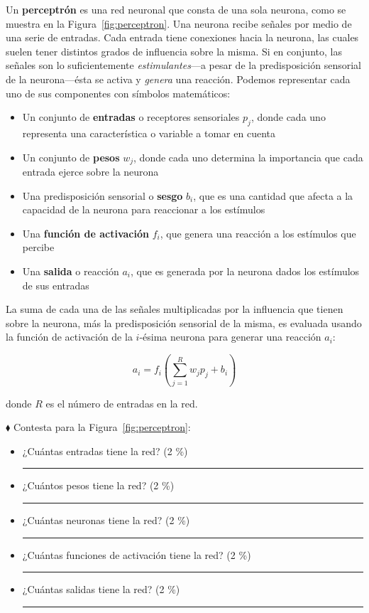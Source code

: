 \documentclass{article}
\newcommand{\veryshortresponserule}{{\large\rule{3 cm}{0.3mm}}}
\begin{document}
Un \textbf{perceptrón} es una red neuronal que consta de una sola neurona, como se muestra en la Figura~\ref{fig:perceptron}.
Una neurona recibe señales por medio de una serie de entradas.
Cada entrada tiene conexiones hacia la neurona, las cuales suelen tener distintos grados de influencia sobre la misma.
Si en conjunto, las señales son lo suficientemente \textit{estimulantes}---a pesar de la predisposición sensorial de la neurona---ésta se activa y \textit{genera} una reacción.
Podemos representar cada uno de sus componentes con símbolos matemáticos:
\begin{itemize}
    \item Un conjunto de \textbf{entradas} o receptores sensoriales $p_j$, donde cada uno representa una característica o variable a tomar en cuenta
    \item Un conjunto de \textbf{pesos} $w_{j}$, donde cada uno determina la importancia que cada entrada ejerce sobre la neurona
    \item Una predisposición sensorial o \textbf{sesgo} $b_i$, que es una cantidad que afecta a la capacidad de la neurona para reaccionar a los estímulos
    \item Una \textbf{función de activación} $f_i$, que genera una reacción a los estímulos que percibe
    \item Una \textbf{salida} o reacción $a_i$, que es generada por la neurona dados los estímulos de sus entradas
\end{itemize}

La suma de cada una de las señales multiplicadas por la influencia que tienen sobre la neurona, más la predisposición sensorial de la misma, es evaluada usando la función de activación de la $i$-ésima neurona para generar una reacción $a_i$:

\begin{equation}
    a_i = f_i\left( \sum_{j=1}^{R} w_jp_j + b_i \right)
\end{equation}

donde $R$ es el número de entradas en la red.

\vspace{2.5ex}

$\blacklozenge$ Contesta para la Figura~\ref{fig:perceptron}:

\begin{itemize}
    \item ¿Cuántas entradas tiene la red? (2 \%)\hfill \veryshortresponserule
    \item ¿Cuántos pesos tiene la red? (2 \%)\hfill \veryshortresponserule
    \item ¿Cuántas neuronas tiene la red? (2 \%)\hfill \veryshortresponserule
    \item ¿Cuántas funciones de activación tiene la red? (2 \%)\hfill \veryshortresponserule
    \item ¿Cuántas salidas tiene la red? (2 \%)\hfill \veryshortresponserule
\end{itemize}
\end{document}

